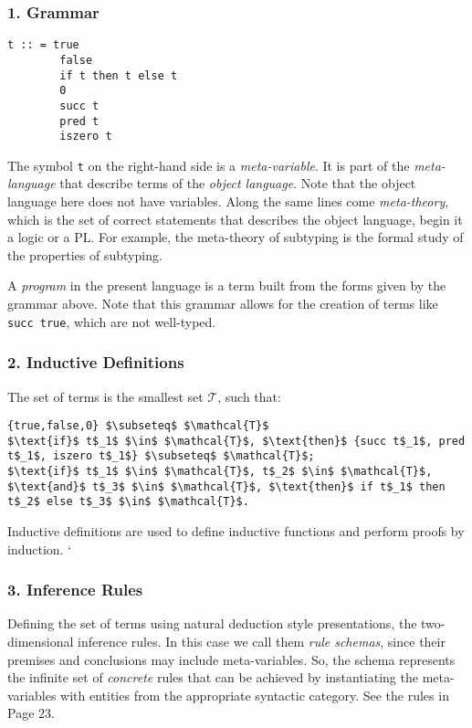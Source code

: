 \documentclass[]{article}
\begin{document}
\subsubsection*{1. Grammar} 
\begin{verbatim}
t :: = true  
        false 
        if t then t else t 
        0 
        succ t 
        pred t 
        iszero t 
\end{verbatim}
The symbol \verb|t| on the right-hand side is a \emph{meta-variable}. It is part of the \emph{meta-language} that describe terms of the \emph{object language}. Note that the object language here does not have variables. Along the same lines come \emph{meta-theory}, which is the set of correct statements that describes the object language, begin it a logic or a PL. For example, the meta-theory of subtyping is the formal study of the properties of subtyping. 

A \emph{program} in the present language is a term built from the forms given by the grammar above. Note that this grammar allows for the creation of terms like \verb|succ true|, which are not well-typed.

\subsubsection*{2. Inductive Definitions}
The set of terms is the smallest set $\mathcal{T}$, such that: 
\begin{lstlisting}[mathescape=true]
{true,false,0} $\subseteq$ $\mathcal{T}$
$\text{if}$ t$_1$ $\in$ $\mathcal{T}$, $\text{then}$ {succ t$_1$, pred t$_1$, iszero t$_1$} $\subseteq$ $\mathcal{T}$; 
$\text{if}$ t$_1$ $\in$ $\mathcal{T}$, t$_2$ $\in$ $\mathcal{T}$, $\text{and}$ t$_3$ $\in$ $\mathcal{T}$, $\text{then}$ if t$_1$ then t$_2$ else t$_3$ $\in$ $\mathcal{T}$.
\end{lstlisting}
Inductive definitions are used to define inductive functions and perform proofs by induction. 	`

\subsubsection*{3. Inference Rules}
Defining the set of terms using natural deduction style presentations, the two-dimensional inference rules. In this case we call them \emph{rule schemas}, since their premises and conclusions may include meta-variables. So, the schema represents the infinite set of \emph{concrete} rules that can be achieved by instantiating the meta-variables with entities from the appropriate syntactic category. See the rules in Page 23. 
\end{document}
